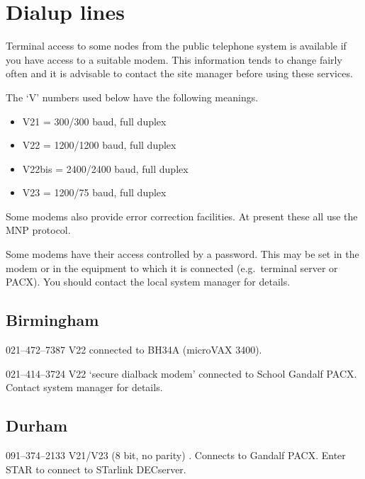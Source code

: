 \section{Dialup lines}

Terminal access to some nodes from the public telephone system is available if
you have access to a suitable modem. This information tends to change fairly
often and it is advisable to contact the site manager before using these
services.

The `V' numbers used below have the following meanings.
\begin{itemize}
\item V21 = 300/300 baud, full duplex
\item V22 = 1200/1200 baud, full duplex
\item V22bis = 2400/2400 baud, full duplex
\item V23 = 1200/75 baud, full duplex
\end{itemize}
Some modems also provide error correction facilities. At present these all use
the MNP protocol. 

Some modems have their access controlled by a password. This may be set in the
modem or in the equipment to which it is connected (e.g.\ terminal server or
PACX). You should contact the local system manager for details.
\newlength{\numlen}
\settowidth{\numlen}{xxxx000--000--0000}
\settowidth{\labelsep}{000}

\subsection{Birmingham}
\begin{list}{}{\setlength{\labelwidth}{\numlen}\setlength{\leftmargin}{\numlen}
\addtolength{\leftmargin}{\labelsep}}
\item[021--472--7387] V22 connected to BH34A (microVAX 3400).
\item[021--414--3724] V22 `secure dialback modem' connected to School Gandalf
PACX. Contact system manager for details.
\end{list}

\subsection{Durham}
\begin{list}{}{\setlength{\labelwidth}{\numlen}\setlength{\leftmargin}{\numlen}
\addtolength{\leftmargin}{\labelsep}}
\item[091--374--2133] V21/V23 (8 bit, no parity) . Connects to 
Gandalf PACX. Enter STAR to connect to STarlink DECserver. 
\end{list}

